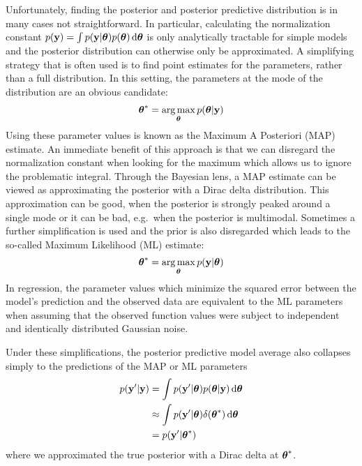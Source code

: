\documentclass[../thesis.tex]{subfiles}
\begin{document}
Unfortunately, finding the posterior and posterior predictive distribution is in many cases not straightforward. In particular, calculating the normalization constant $p(\boldsymbol{\mathbf{y}})=\int p(\boldsymbol{\mathbf{y}} | \boldsymbol{\mathbf{\theta}}) p(\boldsymbol{\mathbf{\theta}}) \mathop{}\!\mathrm{d}\boldsymbol{\mathbf{\theta}}$ is only analytically tractable for simple models and the posterior distribution can otherwise only be approximated. A simplifying strategy that is often used is to find point estimates for the parameters, rather than a full distribution. In this setting, the parameters at the mode of the distribution are an obvious candidate:
\begin{equation}
    \begin{split}
        \boldsymbol{\mathbf{\theta}}^{*} = \operatorname*{arg\,max}_{\boldsymbol{\mathbf{\theta}}} p(\boldsymbol{\mathbf{\theta}} | \boldsymbol{\mathbf{y}})
    \end{split}
\end{equation}
Using these parameter values is known as the Maximum A Posteriori (MAP) estimate. An immediate benefit of this approach is that we can disregard the normalization constant when looking for the maximum which allows us to ignore the problematic integral. Through the Bayesian lens, a MAP estimate can be viewed as approximating the posterior with a Dirac delta distribution. This approximation can be good, when the posterior is strongly peaked around a single mode or it can be bad, e.g.\ when the posterior is multimodal. Sometimes a further simplification is used and the prior is also disregarded which leads to the so-called Maximum Likelihood (ML) estimate:
\begin{equation}
    \begin{split}
        \boldsymbol{\mathbf{\theta}}^{*} = \operatorname*{arg\,max}_{\boldsymbol{\mathbf{\theta}}} p(\boldsymbol{\mathbf{y}} | \boldsymbol{\mathbf{\theta}})
    \end{split}
\end{equation}
In regression, the parameter values which minimize the squared error between the model's prediction and the observed data are equivalent to the ML parameters when assuming that the observed function values were subject to independent and identically distributed Gaussian noise.

Under these simplifications, the posterior predictive model average also collapses simply to the predictions of the MAP or ML parameters
\begin{equation}
    \begin{split}
        p(\boldsymbol{\mathbf{y}}' | \boldsymbol{\mathbf{y}}) &= \int p(\boldsymbol{\mathbf{y}}' | \boldsymbol{\mathbf{\theta}}) p(\boldsymbol{\mathbf{\theta}} | \boldsymbol{\mathbf{y}}) \mathop{}\!\mathrm{d}\boldsymbol{\mathbf{\theta}} \\
        &\approx \int p(\boldsymbol{\mathbf{y}}' | \boldsymbol{\mathbf{\theta}}) \delta(\boldsymbol{\mathbf{\theta}}^{*}) \mathop{}\!\mathrm{d}\boldsymbol{\mathbf{\theta}} \\
        &= p(\boldsymbol{\mathbf{y}}' | \boldsymbol{\mathbf{\theta}}^{*})
    \end{split}
\end{equation}
where we approximated the true posterior with a Dirac delta at $\boldsymbol{\mathbf{\theta}}^{*}$.
\end{document}
